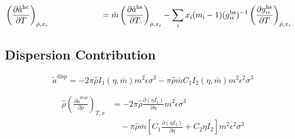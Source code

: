 \documentclass[12pt, letterpaper]{article}
\begin{document}

\begin{equation}
    \begin{aligned}
        \mathmakebox[11.5em][l]{\left(\frac{\partial\tilde{a}^{\mathrm{hc}}}{\partial T}\right)_{\hat{\rho},x_{i}}}
        &=
        \bar{m}\left(\frac{\partial\tilde{a}^{\mathrm{hs}}}{\partial T}\right)_{\hat{\rho},x_{i}}
        -\sum_{i}x_{\mathrm{i}}(m_{\mathrm{i}}-1)(g_{ii}^{\mathrm{hs}})^{-1}\left(\frac{\partial g_{ii}^{\mathrm{hs}}}{\partial T}\right)_{\hat{\rho},x_{i}}
    \end{aligned}
    \label{eq:hc_ares_dT}
\end{equation}


\subsection{Dispersion Contribution}


\begin{equation}
    \tilde{a}^{\mathrm{disp}}=-2 \pi \hat{\rho} I_{1}(\eta, \bar{m}) \overline{m^2 \epsilon \sigma^3}-\pi \hat{\rho} \bar{m} C_{1} I_{2}(\eta, \bar{m}) \overline{m^2 \epsilon^2 \sigma^3}
    \label{eq:ares_disp}
\end{equation}



\begin{equation}
    \begin{aligned}
        \hat{\rho}\left(\frac{\partial\tilde{a}^{disp}}{\partial\hat{\rho}}\right)_{T,x}
        &=-2\pi\hat{\rho}\frac{\partial(\eta I_{1})}{\partial\eta}\overline{m^{2}\epsilon\sigma^{3}}
        \\
        &\quad -\pi\hat{\rho}\bar{m}\left[C_{1}\frac{\partial(\eta I_{2})}{\partial\eta}+C_{2}\eta I_{2}\right]\overline{m^{2}\epsilon^{2}\sigma^{3}}
    \end{aligned}
    \label{eq:disp_ares_dadrho}
\end{equation}
\end{document}
